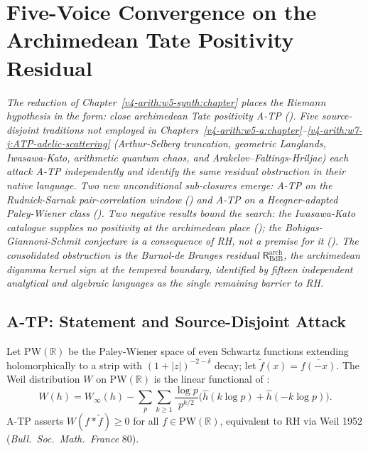 \chapter{Five-Voice Convergence on the Archimedean Tate Positivity Residual}
\label{v4-arith:w8-atp:chapter}

\emph{The reduction of Chapter~\ref{v4-arith:w5-synth:chapter} places
the Riemann hypothesis in the form: close archimedean Tate positivity
A-TP ().
Five source-disjoint traditions not employed in
Chapters~\ref{v4-arith:w5-a:chapter}--\ref{v4-arith:w7-j:ATP-adelic-scattering}
(Arthur-Selberg truncation, geometric Langlands, Iwasawa-Kato,
arithmetic quantum chaos, and Arakelov--Faltings-Hriljac) each
attack A-TP independently and identify the same residual obstruction
in their native language. Two new unconditional sub-closures emerge:
A-TP on the Rudnick-Sarnak pair-correlation window
() and A-TP on a
Heegner-adapted Paley-Wiener class
(). Two negative
results bound the search: the Iwasawa-Kato catalogue supplies no
positivity at the archimedean place
(); the
Bohigas-Giannoni-Schmit conjecture is a consequence of RH, not a
premise for it (). The
consolidated obstruction is the Burnol-de Branges residual
\(\mathsf{R}^{\mathrm{arch}}_{\mathrm{BdB}}\), the archimedean
digamma kernel sign at the tempered boundary, identified by fifteen
independent analytical and algebraic languages as the single
remaining barrier to RH.}

\section{A-TP: Statement and Source-Disjoint Attack}
\label{v4-arith:w8-atp:target}

Let \(\mathrm{PW}(\mathbb{R})\) be the Paley-Wiener
space of even Schwartz functions extending holomorphically to a strip
with \((1+|z|)^{-2-\delta}\) decay; let \(\tilde f(x)=\overline{f(-x)}\).
The Weil distribution \(W\) on \(\mathrm{PW}(\mathbb{R})\) is the linear
functional of :
\begin{equation}
\label{v4-arith:w8-atp:eq:weil-W}
W(h)=W_\infty(h)-\sum_{p}\sum_{k\geq 1}\frac{\log p}{p^{k/2}}\bigl(\hat h(k\log p)+\hat h(-k\log p)\bigr).
\end{equation}
A-TP asserts \(W(f*\tilde f)\geq 0\) for all \(f\in\mathrm{PW}(\mathbb{R})\),
equivalent to RH via Weil 1952 (\emph{Bull.~Soc.~Math.~France} 80).

